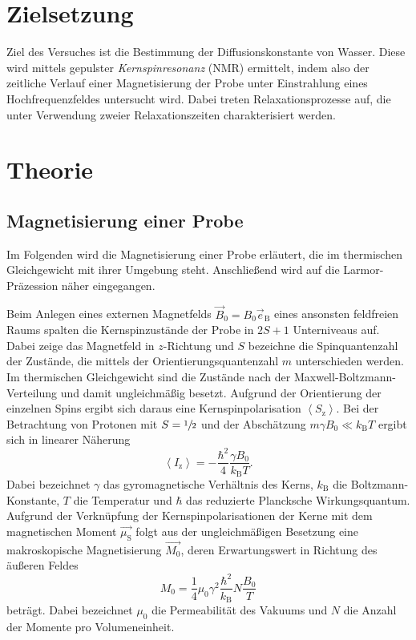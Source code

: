 \section{Zielsetzung}
\label{sec:Zielsetzung}

Ziel des Versuches ist die Bestimmung der Diffusionskonstante von Wasser.
Diese wird mittels gepulster \emph{Kernspinresonanz} (NMR) ermittelt,
indem also der zeitliche Verlauf einer Magnetisierung der Probe unter
Einstrahlung eines Hochfrequenzfeldes untersucht wird.
Dabei treten Relaxationsprozesse auf, die unter Verwendung zweier
Relaxationszeiten charakterisiert werden.

\section{Theorie}
\label{sec:Theorie}

\subsection{Magnetisierung einer Probe}
\label{sec:TheoMagnetisierung}

Im Folgenden wird die Magnetisierung einer Probe erläutert, die im thermischen
Gleichgewicht mit ihrer Umgebung steht.
Anschließend wird auf die Larmor-Präzession näher eingegangen.

Beim Anlegen eines externen Magnetfelds $\vec{B}_0 = B_0 \vec{e}_\text{B}$ eines ansonsten
feldfreien Raums spalten die Kernspinzustände der Probe in $2S+1$ Unterniveaus auf.
Dabei zeige das Magnetfeld in $z$-Richtung und $S$ bezeichne die Spinquantenzahl der
Zustände, die mittels der Orientierungsquantenzahl $m$ unterschieden werden.
Im thermischen Gleichgewicht sind die Zustände nach der Maxwell-Boltzmann-Verteilung
und damit ungleichmäßig besetzt.
Aufgrund der Orientierung der einzelnen Spins ergibt sich daraus eine Kernspinpolarisation
$\left<S_\text{z}\right>$.
Bei der Betrachtung von Protonen mit $S = \sfrac{1}{2}$ und der Abschätzung
$m \gamma B_0 \ll k_\text{B} T$ ergibt sich in linearer Näherung
\begin{equation*}
  \left<I_\text{z}\right> = -\frac{\hbar^2}{4}\frac{\gamma B_0}{k_\text{B} T}.
\end{equation*}
Dabei bezeichnet $\gamma$ das gyromagnetische Verhältnis des Kerns,
$k_\text{B}$ die Boltzmann-Konstante, $T$ die Temperatur
und $\hbar$ das reduzierte Plancksche Wirkungsquantum.
Aufgrund der Verknüpfung der Kernspinpolarisationen der Kerne
mit dem magnetischen Moment $\vec{\mu_\text{S}}$ folgt aus der ungleichmäßigen
Besetzung eine makroskopische Magnetisierung $\vec{M_0}$,
deren Erwartungswert in Richtung des äußeren Feldes
\begin{equation*}
  M_0 = \frac{1}{4} \mu_0 \gamma^2 \frac{\hbar^2}{k_\text{B}} N \frac{B_0}{T}
\end{equation*}
beträgt.
Dabei bezeichnet $\mu_0$ die Permeabilität des Vakuums und
$N$ die Anzahl der Momente pro Volumeneinheit.

